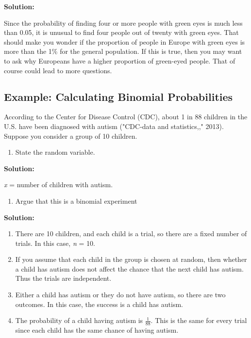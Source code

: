 \documentclass[
]{book}
\providecommand{\tightlist}{%
  \setlength{\itemsep}{0pt}\setlength{\parskip}{0pt}}
\begin{document}
\textbf{Solution:}

Since the probability of finding four or more people with green eyes is much less than 0.05, it is unusual to find four people out of twenty with green eyes. That should make you wonder if the proportion of people in Europe with green eyes is more than the 1\% for the general population. If this is true, then you may want to ask why Europeans have a higher proportion of green-eyed people. That of course could lead to more questions.

\hypertarget{example-calculating-binomial-probabilities-1}{%
\subsection{Example: Calculating Binomial Probabilities}\label{example-calculating-binomial-probabilities-1}}

According to the Center for Disease Control (CDC), about 1 in 88 children in the U.S. have been diagnosed with autism ("CDC-data and statistics,," 2013). Suppose you consider a group of 10 children.

\begin{enumerate}
\def\labelenumi{\alph{enumi}.}
\tightlist
\item
  State the random variable.
\end{enumerate}

\textbf{Solution:}

\emph{x} = number of children with autism.

\begin{enumerate}
\def\labelenumi{\alph{enumi}.}
\setcounter{enumi}{1}
\tightlist
\item
  Argue that this is a binomial experiment
\end{enumerate}

\textbf{Solution:}

\begin{enumerate}
\def\labelenumi{\arabic{enumi}.}
\item
  There are 10 children, and each child is a trial, so there are a fixed number of trials. In this case, \emph{n} = 10.
\item
  If you assume that each child in the group is chosen at random, then whether a child has autism does not affect the chance that the next child has autism. Thus the trials are independent.
\item
  Either a child has autism or they do not have autism, so there are two outcomes. In this case, the success is a child has autism.
\item
  The probability of a child having autism is \(\frac{1}{88}\). This is the same for every trial since each child has the same chance of having autism.
\end{enumerate}
\end{document}
